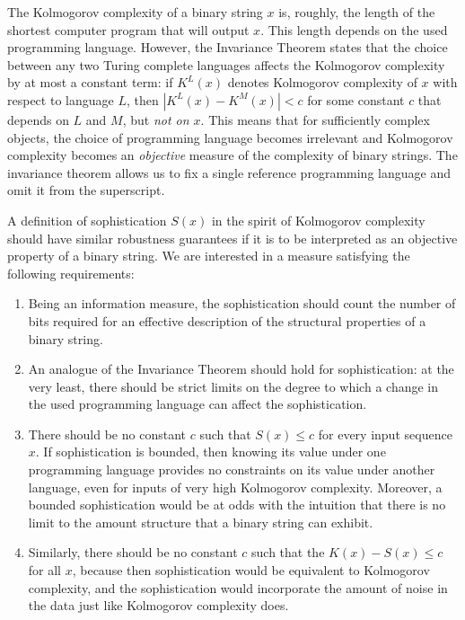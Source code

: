 \documentclass{style/llncs}
\begin{document}
The Kolmogorov complexity of a binary string $x$ is, roughly, the length of the shortest computer program that will output $x$. This length depends on the used programming language. However, the Invariance Theorem states that the choice between any two Turing complete languages affects the Kolmogorov complexity by at most a constant term: if $K^L(x)$ denotes Kolmogorov complexity of $x$ with respect to language $L$, then $|K^L(x)-K^M(x)|<c$ for some constant $c$ that depends on $L$ and $M$, but \emph{not on $x$}. This means that for sufficiently complex objects, the choice of programming language becomes irrelevant and Kolmogorov complexity becomes an \emph{objective} measure of the complexity of binary strings. The invariance theorem allows us to fix a single reference programming language and omit it from the superscript.

A definition of sophistication $S(x)$ in the spirit of Kolmogorov complexity should have similar robustness guarantees if it is to be interpreted as an objective property of a binary string. We are interested in a measure satisfying the following requirements:

\begin{enumerate}
\item Being an information measure, the sophistication should count the number of bits required for an effective description of the structural properties of a binary string.
\item An analogue of the Invariance Theorem should hold for sophistication: at the very least, there should be strict limits on the degree to which a change in the used programming language can affect the sophistication.
\item There should be no constant $c$ such that $S(x)\le c$ for every input sequence $x$. If sophistication is bounded, then knowing its value under one programming language provides no constraints on its value under another language, even for inputs of very high Kolmogorov complexity. Moreover, a bounded sophistication would be at odds with the intuition that there is no limit to the amount structure that a binary string can exhibit.
\item Similarly, there should be no constant $c$ such that the $K(x)-S(x)\le c$ for all $x$, because then sophistication would be equivalent to Kolmogorov complexity, and the sophistication would incorporate the amount of noise in the data just like Kolmogorov complexity does.
\end{enumerate}
\end{document}
